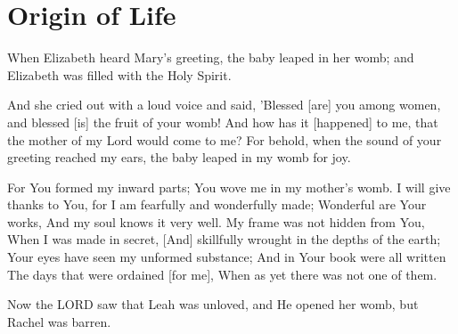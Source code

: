 \chapter{Origin of Life}


\begin{scripture}[Luke 1:41-44]
    When Elizabeth heard Mary's greeting, the baby leaped in her womb; and Elizabeth was filled with the Holy Spirit.    \begin{poetry}
        And she cried out with a loud voice and said, 'Blessed [are] you among women, and blessed [is] the fruit of your womb!
        And how has it [happened] to me, that the mother of my Lord would come to me?
        For behold, when the sound of your greeting reached my ears, the baby leaped in my womb for joy.    \end{poetry}
\end{scripture}



\vspace{6\baselineskip}



\begin{scripture}[Psalm 139:13-16]

    For You formed my inward parts; You wove me in my mother's womb.  
        I will give thanks to You, for I am fearfully and wonderfully made; Wonderful are Your works, And my soul knows it very well.
        My frame was not hidden from You, When I was made in secret, [And] skillfully wrought in the depths of the earth;
        Your eyes have seen my unformed substance; And in Your book were all written The days that were ordained [for me], When as yet there was not one of them.
\end{scripture}

\vspace{2\baselineskip}

\begin{scripture}[Genesis 29:31]
    Now the LORD saw that Leah was unloved, and He opened her womb, but Rachel was barren.
\end{scripture}

